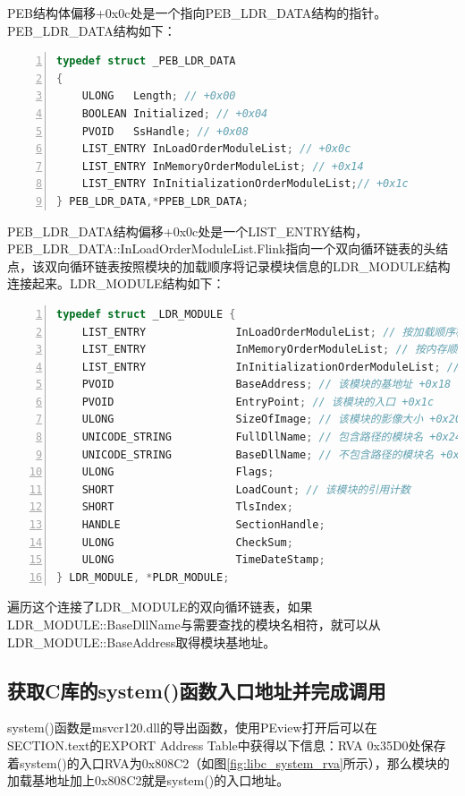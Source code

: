 \documentclass[bachelor]{thesis-uestc}
\begin{document}
PEB结构体偏移+0x0c处是一个指向PEB\_LDR\_DATA结构的指针。PEB\_LDR\_DATA结构如下：

\begin{lstlisting}[language=C++, basicstyle=\ttfamily\tiny, numbers=left, numberstyle=\tiny, keywordstyle=\color{blue!70}, commentstyle=\color{red!50!green!50!blue!50}, frame=shadowbox, rulesepcolor=\color{red!20!green!20!blue!20}]
typedef struct _PEB_LDR_DATA
{
	ULONG	Length; // +0x00
	BOOLEAN	Initialized; // +0x04
	PVOID	SsHandle; // +0x08
	LIST_ENTRY InLoadOrderModuleList; // +0x0c
	LIST_ENTRY InMemoryOrderModuleList; // +0x14
	LIST_ENTRY InInitializationOrderModuleList;// +0x1c
} PEB_LDR_DATA,*PPEB_LDR_DATA;
\end{lstlisting}

PEB\_LDR\_DATA结构偏移+0x0c处是一个LIST\_ENTRY结构，PEB\_LDR\_DATA::InLoadOrderModuleList.Flink指向一个双向循环链表的头结点，该双向循环链表按照模块的加载顺序将记录模块信息的LDR\_MODULE结构连接起来。LDR\_MODULE结构如下：

\begin{lstlisting}[language=C++, basicstyle=\ttfamily\tiny, numbers=left, numberstyle=\tiny, keywordstyle=\color{blue!70}, commentstyle=\color{red!50!green!50!blue!50}, frame=shadowbox, rulesepcolor=\color{red!20!green!20!blue!20}]
typedef struct _LDR_MODULE {
	LIST_ENTRY              InLoadOrderModuleList; // 按加载顺序构成的模块链表 +0x00
	LIST_ENTRY              InMemoryOrderModuleList; // 按内存顺序构成的模块链表 +0x08
	LIST_ENTRY              InInitializationOrderModuleList; // 按初始化顺序构成的模块链表 +0x10
	PVOID                   BaseAddress; // 该模块的基地址 +0x18
	PVOID                   EntryPoint; // 该模块的入口 +0x1c
	ULONG                   SizeOfImage; // 该模块的影像大小 +0x20
	UNICODE_STRING          FullDllName; // 包含路径的模块名 +0x24
	UNICODE_STRING          BaseDllName; // 不包含路径的模块名 +0x28
	ULONG                   Flags;
	SHORT                   LoadCount; // 该模块的引用计数
	SHORT                   TlsIndex;
	HANDLE                  SectionHandle;
	ULONG                   CheckSum;
	ULONG                   TimeDateStamp;
} LDR_MODULE, *PLDR_MODULE;
\end{lstlisting}

遍历这个连接了LDR\_MODULE的双向循环链表，如果LDR\_MODULE::BaseDllName与需要查找的模块名相符，就可以从LDR\_MODULE::BaseAddress取得模块基地址。

\subsection{获取C库的system()函数入口地址并完成调用}
system()函数是msvcr120.dll的导出函数，使用PEview打开后可以在SECTION.text的EXPORT Address Table中获得以下信息：RVA 0x35D0处保存着system()的入口RVA为0x808C2（如图\ref{fig:libc_system_rva}所示），那么模块的加载基地址加上0x808C2就是system()的入口地址。
\end{document}
